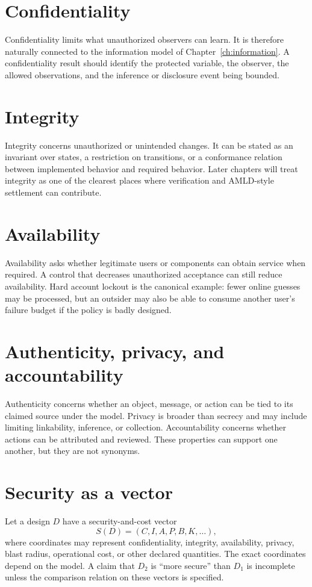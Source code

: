 \documentclass[11pt,oneside]{book}
\theoremstyle{definition}
\theoremstyle{remark}
\begin{document}
\section{Confidentiality}
Confidentiality limits what unauthorized observers can learn. It is therefore naturally connected to the information model of Chapter~\ref{ch:information}. A confidentiality result should identify the protected variable, the observer, the allowed observations, and the inference or disclosure event being bounded.

\section{Integrity}
Integrity concerns unauthorized or unintended changes. It can be stated as an invariant over states, a restriction on transitions, or a conformance relation between implemented behavior and required behavior. Later chapters will treat integrity as one of the clearest places where verification and AMLD-style settlement can contribute.

\section{Availability}
Availability asks whether legitimate users or components can obtain service when required. A control that decreases unauthorized acceptance can still reduce availability. Hard account lockout is the canonical example: fewer online guesses may be processed, but an outsider may also be able to consume another user's failure budget if the policy is badly designed.

\section{Authenticity, privacy, and accountability}
Authenticity concerns whether an object, message, or action can be tied to its claimed source under the model. Privacy is broader than secrecy and may include limiting linkability, inference, or collection. Accountability concerns whether actions can be attributed and reviewed. These properties can support one another, but they are not synonyms.

\section{Security as a vector}
\label{sec:security-vector}
Let a design $D$ have a security-and-cost vector
\[
S(D)=(C,I,A,P,B,K,\ldots),
\]
where coordinates may represent confidentiality, integrity, availability, privacy, blast radius, operational cost, or other declared quantities. The exact coordinates depend on the model. A claim that $D_2$ is ``more secure'' than $D_1$ is incomplete unless the comparison relation on these vectors is specified.
\end{document}
